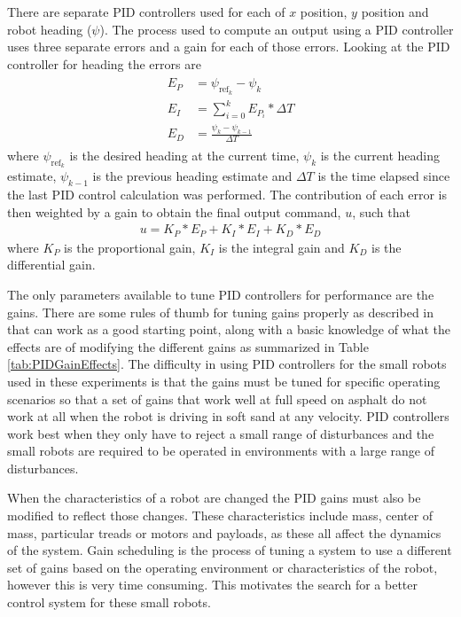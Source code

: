 There are separate PID controllers used for each of $x$ position, $y$ position and robot heading ($\psi$). The process used to compute an output using a PID controller uses three separate errors and a gain for each of those errors. Looking at the PID controller for heading the errors are
\begin{align*}
\begin{split}
E_P &= \psi_{\text{ref}_k} - \psi_k \\
E_I &= \sum_{i=0}^{k}E_{P_i}*\Delta T \\
E_D &= \frac{\psi_k - \psi_{k-1}}{\Delta T}
\end{split}
\end{align*}
where $\psi_{\text{ref}_k}$ is the desired heading at the current time, $\psi_k$ is the current heading estimate, $\psi_{k-1}$ is the previous heading estimate and $\Delta T$ is the time elapsed since the last PID control calculation was performed. The contribution of each error is then weighted by a gain to obtain the final output command, $u$, such that
\begin{align*}
u = K_P*E_P + K_I*E_I + K_D*E_D
\end{align*}
where $K_P$ is the proportional gain, $K_I$ is the integral gain and $K_D$ is the differential gain.

The only parameters available to tune PID controllers for performance are the gains. There are some rules of thumb for tuning gains properly as described in \cite{ZeiglerNichols42} that can work as a good starting point, along with a basic knowledge of what the effects are of modifying the different gains as summarized in Table \ref{tab:PIDGainEffects}. The difficulty in using PID controllers for the small robots used in these experiments is that the gains must be tuned for specific operating scenarios so that a set of gains that work well at full speed on asphalt do not work at all when the robot is driving in soft sand at any velocity. PID controllers work best when they only have to reject a small range of disturbances and the small robots are required to be operated in environments with a large range of disturbances.

When the characteristics of a robot are changed the PID gains must also be modified to reflect those changes. These characteristics include mass, center of mass, particular treads or motors and payloads, as these all affect the dynamics of the system. Gain scheduling is the process of tuning a system to use a different set of gains based on the operating environment or characteristics of the robot, however this is very time consuming. This motivates the search for a better control system for these small robots.

